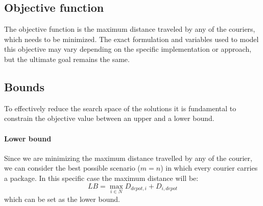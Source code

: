 
\subsection{Objective function}

The objective function is the maximum distance traveled by any of the couriers, which needs to be minimized. The exact formulation and variables used to model this objective may vary depending on the specific implementation or approach, but the ultimate goal remains the same.

\subsection{Bounds}
To effectively reduce the search space of the solutions it is fundamental to constrain the objective value between an upper and a lower bound. \paragraph{Lower bound} Since we are minimizing the maximum distance travelled by any of the courier, we can consider the best possible scenario ($m = n$) in which every courier carries a package. In this specific case the maximum distance will be:
\begin{equation}
    LB = \max_{i \in N} D_{depot,i} + D_{i,depot}
\end{equation}
which can be set as the lower bound.
